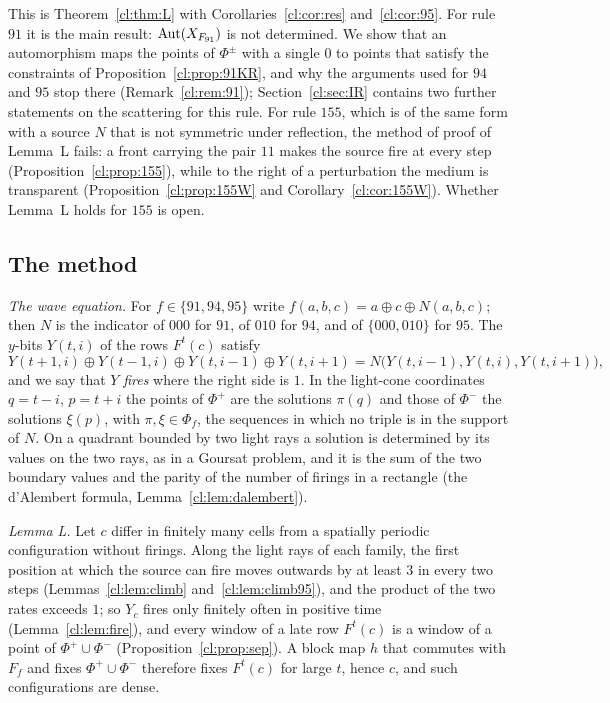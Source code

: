 This is Theorem~\ref{cl:thm:L} with Corollaries~\ref{cl:cor:res} and~\ref{cl:cor:95}. For rule $91$ it is the main result: $\operatorname{Aut}(X_{F_{91}})$ is not determined. We show that an automorphism maps the points of $\Phi^\pm$ with a single $0$ to points that satisfy the constraints of Proposition~\ref{cl:prop:91KR}, and why the arguments used for $94$ and $95$ stop there (Remark~\ref{cl:rem:91}); Section~\ref{cl:sec:IR} contains two further statements on the scattering for this rule. For rule $155$, which is of the same form with a source $N$ that is not symmetric under reflection, the method of proof of Lemma~L fails: a front carrying the pair $11$ makes the source fire at every step (Proposition~\ref{cl:prop:155}), while to the right of a perturbation the medium is transparent (Proposition~\ref{cl:prop:155W} and Corollary~\ref{cl:cor:155W}). Whether Lemma~L holds for $155$ is open.

\subsection{The method}

\emph{The wave equation.} For $f\in\{91,94,95\}$ write $f(a,b,c)=a\oplus c\oplus N(a,b,c)$; then $N$ is the indicator of $000$ for $91$, of $010$ for $94$, and of $\{000,010\}$ for $95$. The $y$-bits $Y(t,i)$ of the rows $F^t(c)$ satisfy
\[
Y(t+1,i)\oplus Y(t-1,i)\oplus Y(t,i-1)\oplus Y(t,i+1)=N\bigl(Y(t,i-1),Y(t,i),Y(t,i+1)\bigr),
\]
and we say that $Y$ \emph{fires} where the right side is $1$. In the light-cone coordinates $q=t-i$, $p=t+i$ the points of $\Phi^+$ are the solutions $\pi(q)$ and those of $\Phi^-$ the solutions $\xi(p)$, with $\pi,\xi\in\Phi_f$, the sequences in which no triple is in the support of $N$. On a quadrant bounded by two light rays a solution is determined by its values on the two rays, as in a Goursat problem, and it is the sum of the two boundary values and the parity of the number of firings in a rectangle (the d'Alembert formula, Lemma~\ref{cl:lem:dalembert}).

\emph{Lemma L.} Let $c$ differ in finitely many cells from a spatially periodic configuration without firings. Along the light rays of each family, the first position at which the source can fire moves outwards by at least $3$ in every two steps (Lemmas~\ref{cl:lem:climb} and~\ref{cl:lem:climb95}), and the product of the two rates exceeds $1$; so $Y_c$ fires only finitely often in positive time (Lemma~\ref{cl:lem:fire}), and every window of a late row $F^t(c)$ is a window of a point of $\Phi^+\cup\Phi^-$ (Proposition~\ref{cl:prop:sep}). A block map $h$ that commutes with $F_f$ and fixes $\Phi^+\cup\Phi^-$ therefore fixes $F^t(c)$ for large $t$, hence $c$, and such configurations are dense.

